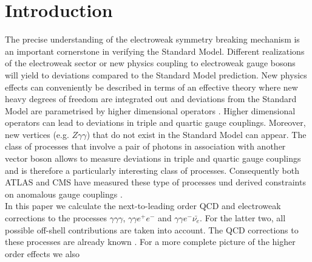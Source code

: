 \section{Introduction}
\label{sec:intro}

The precise understanding of the electroweak symmetry breaking mechanism is an important cornerstone in verifying the
Standard Model. Different realizations of the electroweak sector or new physics coupling to electroweak gauge bosons will
yield to deviations compared to the Standard Model prediction. New physics effects can conveniently be described in terms
of an effective theory where new heavy degrees of freedom are integrated out and deviations from the Standard Model are 
parametrised by higher dimensional operators \cite{Weinberg:1978kz,Weinberg:1979pi}. Higher dimensional operators can lead
 to deviations in triple and quartic gauge couplings. Moreover, new vertices (e.g. $Z\gamma\gamma$) that do not exist in the 
Standard Model can appear. The class of processes that involve a pair of photons in association with another vector boson
allows to measure deviations in triple and quartic gauge couplings and is therefore a particularly interesting class of processes.
 Consequently both ATLAS and CMS have measured these type of processes und derived constraints on anomalous gauge
 couplings \cite{Aad:2016sau,Sirunyan:2017lvq,Aad:2015uqa,Aad:2015bua}.\\
 In this paper we calculate the next-to-leading order QCD and electroweak corrections to the processes 
 $\gamma\gamma\gamma$, $\gamma\gamma e^{+} e^{-}$ and $\gamma\gamma e^{-} \bar{\nu_e}$. For the latter two, all
 possible off-shell contributions are taken into account. The QCD corrections to these processes are already known 
 \cite{Bozzi:2011en,Campbell:2012ft,Bozzi:2011wwa}. For a more complete picture of the higher order effects we also
 